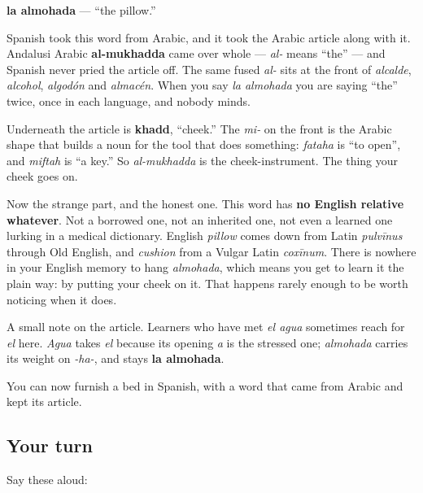 \begin{cousinweb}
\textbf{la almohada} — \textquotedblleft{}the pillow.\textquotedblright{}

Spanish took this word from Arabic, and it took the Arabic article along with it. Andalusi Arabic \textbf{al-mukhadda} came over whole — \emph{al-} means \textquotedblleft{}the\textquotedblright{} — and Spanish never pried the article off. The same fused \emph{al-} sits at the front of \emph{alcalde}, \emph{alcohol}, \emph{algodón} and \emph{almacén}. When you say \emph{la almohada} you are saying \textquotedblleft{}the\textquotedblright{} twice, once in each language, and nobody minds.

Underneath the article is \textbf{khadd}, \textquotedblleft{}cheek.\textquotedblright{} The \emph{mi-} on the front is the Arabic shape that builds a noun for the tool that does something: \emph{fataha} is \textquotedblleft{}to open\textquotedblright{}, and \emph{miftah} is \textquotedblleft{}a key.\textquotedblright{} So \emph{al-mukhadda} is the cheek-instrument. The thing your cheek goes on.

Now the strange part, and the honest one. This word has \textbf{no English relative whatever}. Not a borrowed one, not an inherited one, not even a learned one lurking in a medical dictionary. English \emph{pillow} comes down from Latin \emph{pulvīnus} through Old English, and \emph{cushion} from a Vulgar Latin \emph{coxīnum}. There is nowhere in your English memory to hang \emph{almohada}, which means you get to learn it the plain way: by putting your cheek on it. That happens rarely enough to be worth noticing when it does.

A small note on the article. Learners who have met \emph{el agua} sometimes reach for \emph{el} here. \emph{Agua} takes \emph{el} because its opening \emph{a} is the stressed one; \emph{almohada} carries its weight on \emph{-ha-}, and stays \textbf{la almohada}.
\end{cousinweb}

\begin{grammarlens}[title={What you've built}]
You can now furnish a bed in Spanish, with a word that came from Arabic and kept its article.
\end{grammarlens}

\subsection*{Your turn}
Say these aloud:

